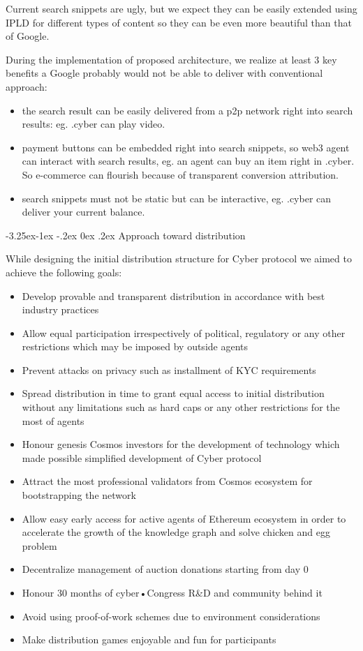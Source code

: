 \documentclass[8pt,oneside]{amsart}
\makeatletter
\renewcommand\subsection{\@startsection{subsection}{2}{\z@}%
                                     {-3.25ex\@plus -1ex \@minus -.2ex}%
                                     {0ex \@plus .2ex}%
                                     {\play\Large}}%
\newcommand{\titleSection}[1]{\subsection{#1}}
\newcommand{\code}[1]{{\PlayBold #1}}
\makeatother
\begin{document}
Current search snippets are ugly, but we expect they can be easily extended using IPLD for different types of content so they can be even more beautiful than that of Google.

During the implementation of proposed architecture, we realize at least 3 key benefits a Google probably would not be able to deliver with conventional approach:

\begin{itemize}
\item the search result can be easily delivered from a p2p network right into search results: eg. .cyber can play video.
\item payment buttons can be embedded right into search snippets, so web3 agent can interact with search results, eg. an agent can buy an item right in \code{.cyber}. So e-commerce can flourish because of transparent conversion attribution.
\item search snippets must not be static but can be interactive, eg. \code{.cyber} can deliver your current balance.
\end{itemize}

\titleSection{Approach toward distribution}\label{Approach toward distribution}

While designing the initial distribution structure for Cyber protocol we aimed to achieve the following goals:

\begin{itemize}
\item Develop provable and transparent distribution in accordance with best industry practices
\item Allow equal participation irrespectively of political, regulatory or any other restrictions which may be imposed by outside agents
\item Prevent attacks on privacy such as installment of KYC requirements
\item Spread distribution in time to grant equal access to initial distribution without any limitations such as hard caps or any other restrictions for the most of agents
\item Honour genesis Cosmos investors for the development of technology which made possible simplified development of Cyber protocol
\item Attract the most professional validators from Cosmos ecosystem for bootstrapping the network
\item Allow easy early access for active agents of Ethereum ecosystem in order to accelerate the growth of the knowledge graph and solve chicken and egg problem
\item Decentralize management of auction donations starting from day 0
\item Honour 30 months of cyber•Congress R\&D and community behind it
\item Avoid using proof-of-work schemes due to environment considerations
\item Make distribution games enjoyable and fun for participants
\end{itemize}
\end{document}
